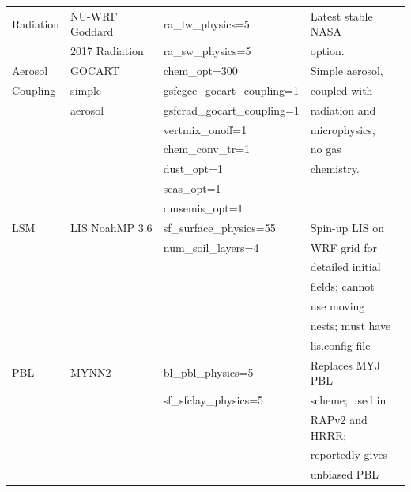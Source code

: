 \begin{tabular}{|l|l|l|l|}
Radiation    & NU-WRF Goddard& ra\_lw\_physics=5 & Latest stable NASA   \\
             & 2017 Radiation& ra\_sw\_physics=5 & option.              \\ \hline
Aerosol      & GOCART        & chem\_opt=300       & Simple aerosol, \\
Coupling     & simple        & gsfcgce\_gocart\_coupling=1 & coupled with    \\
             & aerosol       & gsfcrad\_gocart\_coupling=1 & radiation and   \\
             &               & vertmix\_onoff=1            & microphysics,   \\
             &               & chem\_conv\_tr=1            & no gas          \\
             &               & dust\_opt=1                 & chemistry.      \\
             &               & seas\_opt=1                 & \\
             &               & dmsemis\_opt=1              & \\ \hline
LSM          & LIS NoahMP 3.6  & sf\_surface\_physics=55     & Spin-up LIS on  \\
             &               & num\_soil\_layers=4         & WRF grid for    \\
             &               &                             & detailed initial\\
             &               &                             & fields; cannot  \\
             &               &                             & use moving      \\
             &               &                             & nests; must have\\
             &               &                             & lis.config file \\ \hline
PBL          & MYNN2         & bl\_pbl\_physics=5          & Replaces MYJ PBL\\
             &               & sf\_sfclay\_physics=5       & scheme; used in \\
             &               &                             & RAPv2 and HRRR; \\
             &               &                             & reportedly gives\\
             &               &                             & unbiased PBL    \\

\end{tabular}
